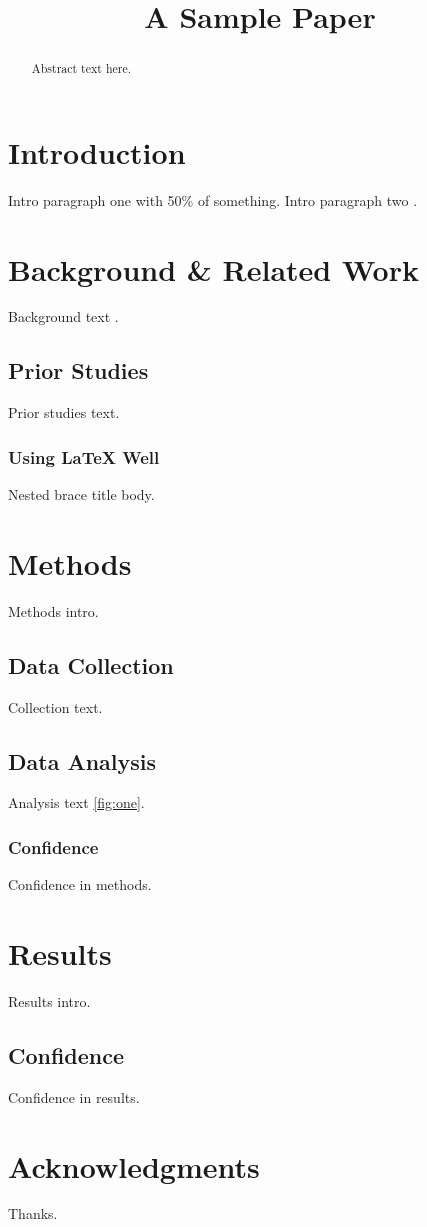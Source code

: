 \documentclass{article}
\begin{document}
\title{A Sample Paper}
\maketitle
\begin{abstract}
Abstract text here.
\end{abstract}

\section{Introduction}
Intro paragraph one with 50\% of something. %
Intro paragraph two \cite{smith2020}.

\section[Short]{Background \& Related Work}
Background text \cite{jones2019,smith2020}.
\subsection{Prior Studies}
Prior studies text.
\subsubsection{Using \LaTeX{} Well}
Nested brace title body.

\section{Methods}
Methods intro.
\subsection{Data Collection}
Collection text.
\subsection{Data Analysis}
Analysis text \ref{fig:one}.
\subsubsection{Confidence}
Confidence in methods.

\section{Results}
Results intro.
\subsection{Confidence}
Confidence in results.

\section*{Acknowledgments}
Thanks.



\end{document}
